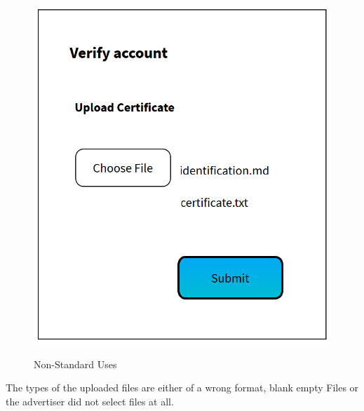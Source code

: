 \begin{minipage}{0.5\textwidth}
\begin{figure}[H]
\includegraphics[scale=.6]{SystemSpec/Usecases/Mocks/reqVerNon01.png}\\
\caption{\label{fig:blue_rectangle}Non-Standard Uses}
\end{figure}
\end{minipage} \hfill
\begin{minipage}{0.5\textwidth}
The types of the uploaded files are either of a wrong format, blank empty Files or the advertiser did not select files at all. 
\end{minipage}

\pagebreak
